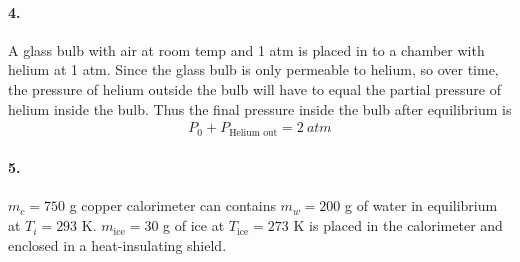 \documentclass[../main.tex]{subfiles}
\begin{document}
\newpage
\paragraph{4.} A glass bulb with air at room temp and 1 atm is placed in to a chamber with helium at 1 atm.
Since the glass bulb is only permeable to helium, so over time, the pressure of helium outside the bulb will have to equal the
partial pressure of helium inside the bulb. Thus the final pressure inside the bulb after equilibrium is
\begin{align*}
    \boxed{P_0 + P_\text{Helium out} = \qty{2}{atm}}
\end{align*}

\newpage
\paragraph{5.} $m_c = 750$ g copper calorimeter can contains $m_w = 200$ g of water in equilibrium at $T_i = 293$ K.
$m_\text{ice} = 30$ g of ice at $T_\text{ice} = 273$ K is placed in the calorimeter and enclosed in a heat-insulating shield.
\end{document}

